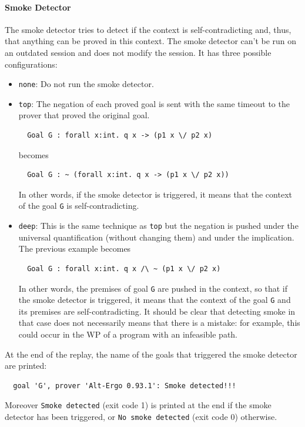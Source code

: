 \paragraph{Smoke Detector}

The smoke detector tries to detect if the context is
self-contradicting and, thus, that anything can be proved in this
context. The smoke detector can't be run on an outdated session and does
not modify the session.  It has three possible configurations:
\begin{itemize}
\item \texttt{none}: Do not run the smoke detector.

\item \texttt{top}: The negation of each proved goal is sent with the
  same timeout to the prover that proved the original goal.
\begin{verbatim}
  Goal G : forall x:int. q x -> (p1 x \/ p2 x)
\end{verbatim}
  becomes
\begin{verbatim}
  Goal G : ~ (forall x:int. q x -> (p1 x \/ p2 x))
\end{verbatim}
  In other words, if the smoke detector is triggered, it means that the context
  of the goal \texttt{G} is self-contradicting.

\item \texttt{deep}: This is the same technique as \texttt{top} but
  the negation is pushed under the universal quantification (without
  changing them) and under the implication. The previous example
  becomes
\begin{verbatim}
  Goal G : forall x:int. q x /\ ~ (p1 x \/ p2 x)
\end{verbatim}
  In other words, the premises of goal \texttt{G} are pushed in the
  context, so that if the smoke detector is triggered, it means that
  the context of the goal \texttt{G} and its premises are
  self-contradicting. It should be clear that detecting smoke in that
  case does not necessarily means that there is a mistake: for
  example, this could occur in the WP of a program with an infeasible
  path.
\end{itemize}

At the end of the replay, the name of the goals that triggered the
smoke detector are printed:
\begin{verbatim}
  goal 'G', prover 'Alt-Ergo 0.93.1': Smoke detected!!!
\end{verbatim}
Moreover \texttt{Smoke detected} (exit code 1) is printed at the end
if the smoke detector has been triggered, or \texttt{No smoke
  detected} (exit code 0) otherwise.




